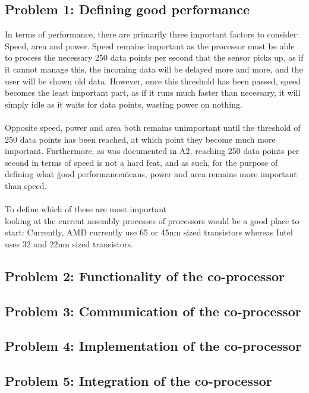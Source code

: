 \documentclass[12pt,a4paper]{article}
\begin{document}
\subsection{Problem 1: Defining good performance}
	In terms of performance, there are primarily three important factors to consider: Speed, area and power. Speed remains important as the processor must be able to process the necessary 250 data points per second that the sensor picks up, as if it cannot manage this, the incoming data will be delayed more and more, and the user will be shown old data. However, once this threshold has been passed, speed becomes the least important part, as if it runs much faster than necessary, it will simply idle as it waits for data points, wasting power on nothing.\\
	\\
	Opposite speed, power and area both remains unimportant until the threshold of 250 data points has been reached, at which point they become much more important. Furthermore, as was documented in A2, reaching 250 data points per second in terms of speed is not a hard feat, and as such, for the purpose of defining what \"good performance\" means, power and area remains more important than speed.\\
	\\
	To define which of these are most important\\
	
	looking at the current assembly processes of processors would be a good place to start: Currently, AMD currently use 65 or 45nm sized transistors whereas Intel uses 32 and 22nm sized transistors. 
\subsection{Problem 2: Functionality of the co-processor}
	
\subsection{Problem 3: Communication of the co-processor}
	
\subsection{Problem 4: Implementation of the co-processor}

\subsection{Problem 5: Integration of the co-processor}
	
\end{document}
